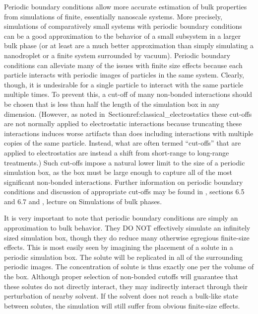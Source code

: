 \documentclass[9pt,bestpractices]{livecoms}
\begin{document}
Periodic boundary conditions allow more accurate estimation of bulk properties from simulations of finite, essentially nanoscale systems.
More precisely, simulations of comparatively small systems with periodic boundary conditions can be a good approximation to the behavior of a small subsystem in a larger bulk phase (or at least are a much better approximation than simply simulating a nanodroplet or a finite system surrounded by vacuum).
Periodic boundary conditions can alleviate many of the issues with finite size effects because each particle interacts with periodic images of particles in the same system.
Clearly, though, it is undesirable for a single particle to interact with the same particle multiple times.
To prevent this, a cut-off of many non-bonded interactions should be chosen that is less than half the length of the simulation box in any dimension.
(However, as noted in~Section{ref:classical_electrostatics} these cut-offs are not normally applied to electrostatic interactions because truncating these interactions induces worse artifacts than does including interactions with multiple copies of the same particle. 
Instead, what are often termed ``cut-offs'' that are applied to electrostatics are instead a shift from short-range to long-range treatments.)
Such cut-offs impose a natural lower limit to the size of a periodic simulation box, as the box must be large enough to capture all of the most significant non-bonded interactions.
Further information on periodic boundary conditions and discussion of appropriate cut-offs may be found in \citet{LeachBook}, sections 6.5 and 6.7 and \citet{ShellNotes}, lecture on Simulations of bulk phases.

It is very important to note that periodic boundary conditions are simply an approximation to bulk behavior.
They DO NOT effectively simulate an infinitely sized simulation box, though they do reduce many otherwise egregious finite-size effects.
This is most easily seen by imagining the placement of a solute in a periodic simulation box.
The solute will be replicated in all of the surrounding periodic images.
The concentration of solute is thus exactly one per the volume of the box.
Although proper selection of non-bonded cutoffs will guarantee that these solutes do not directly interact, they may indirectly interact through their perturbation of nearby solvent.
If the solvent does not reach a bulk-like state between solutes, the simulation will still suffer from obvious finite-size effects.
\end{document}
